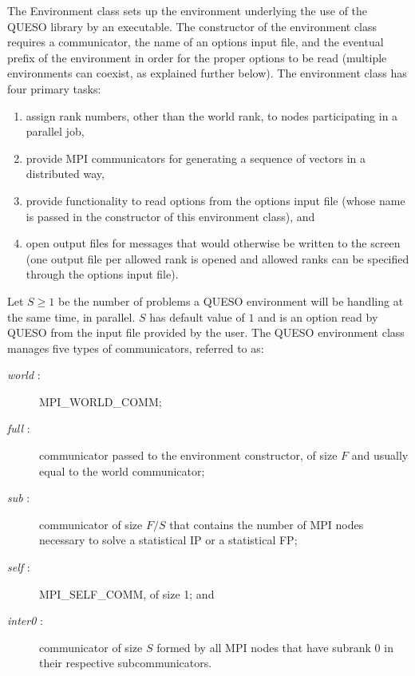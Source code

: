 %
The Environment class sets up the environment underlying the use of the QUESO library by an executable.
The constructor of the environment class requires a communicator, the name of an options input file,
and the eventual prefix of the environment in order for the proper options to be read (multiple environments can coexist, as explained further below).
The environment class has four primary tasks:
\begin{enumerate}
\item assign rank numbers, other than the world rank, to nodes participating in a parallel job,
\item provide MPI communicators for generating a sequence of vectors in a distributed way,
\item provide functionality to read options from the options input file (whose name is passed in the constructor of this environment class), and
\item open output files for messages that would otherwise be written to the screen (one output file per allowed rank is opened and allowed ranks can be specified through the options input file).
 
\end{enumerate}



Let $S \geqslant 1$ be the number of problems a QUESO environment will be handling at the same time, in parallel.
$S$ has default value of $1$ and is an option read by QUESO from the input file provided by the user.
The QUESO environment class manages five types of communicators, referred to as:
\begin{description}
\item[{\it world} :] MPI\_WORLD\_COMM;
\item[{\it full} :] communicator passed to the environment constructor, of size $F$ and usually equal to the world communicator;
\item[{\it sub} :] communicator of size $F/S$ that contains the number of MPI nodes necessary to solve a statistical IP or a statistical FP;
\item[{\it self} :] MPI\_SELF\_COMM, of size 1; and
\item[{\it inter0} :] communicator of size $S$ formed by all MPI nodes that have subrank 0 in their respective subcommunicators.
\end{description}


